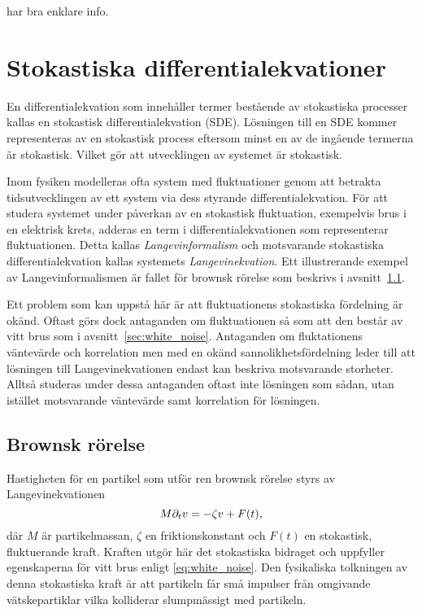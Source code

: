 \cite{Dieker_fBm} har bra enklare info.


\section{Stokastiska differentialekvationer}
En differentialekvation som innehåller termer bestående av stokastiska
processer kallas en stokastisk differentialekvation (SDE). Lösningen
till en SDE kommer representeras av en stokastisk process eftersom
minst en av de ingående termerna är stokastisk. Vilket gör att utvecklingen av systemet är stokastisk.

Inom fysiken modelleras ofta system med fluktuationer genom
att betrakta tidsutvecklingen av ett system via dess styrande
differentialekvation. 
För att studera systemet under påverkan av en stokastisk fluktuation,
exempelvis brus i en elektrisk krets, adderas en term i
differentialekvationen som representerar fluktuationen. 
Detta kallas \emph{Langevinformalism} och motsvarande stokastiska
differentialekvation kallas systemets \emph{Langevinekvation}. 
Ett illustrerande exempel av Langevinformalismen är fallet för
brownsk rörelse som beskrivs i avsnitt~\ref{sec:brown}.

Ett problem som kan uppstå här är att fluktuationens stokastiska fördelning är okänd. Oftast görs dock antaganden om fluktuationen så som att den består av vitt brus som i avsnitt~\ref{sec:white_noise}. 
Antaganden om fluktationens väntevärde och korrelation men med en okänd sannolikhetsfördelning leder till att lösningen till Langevinekvationen endast kan beskriva motsvarande storheter. Alltså studeras under dessa antaganden oftast inte lösningen som sådan, utan istället motsvarande väntevärde samt korrelation för lösningen.  






\subsection{Brownsk rörelse}\label{sec:brown}
\label{brownsk}
Hastigheten för en partikel som utför ren brownsk rörelse styrs av
Langevinekvationen~\cite{Mazo_Brownian2002} 
\begin{equation} \label{eq:Brownian_SDE}
    M\partial_tv=-\zeta v + F(t),
\end{equation}
där $M$ är partikelmassan, $\zeta$ en friktionskonstant och $F(t)$ en
stokastisk, fluktuerande kraft. Kraften utgör här det stokastiska
bidraget och uppfyller egenskaperna för vitt brus enligt \eqref{eq:white_noise}.
Den fysikaliska tolkningen av denna stokastiska kraft är att partikeln
får små impulser från omgivande vätskepartiklar vilka kolliderar
slumpmässigt med partikeln.  

